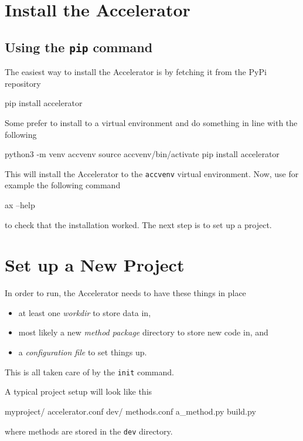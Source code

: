 
\section{Install the Accelerator}

\subsection{Using the \texttt{pip} command}
The easiest way to install the Accelerator is by fetching it from the
PyPi repository
\begin{shell}
pip install accelerator
\end{shell}
Some prefer to install to a virtual environment and do something in
line with the following
\begin{shell}
python3 -m venv accvenv
source accvenv/bin/activate
pip install accelerator
\end{shell}
This will install the Accelerator to the \texttt{accvenv} virtual
environment.  Now, use for example the following command
\begin{shell}
ax --help
\end{shell}
to check that the installation worked.  The next step is to set up a
project.



\section{Set up a New Project}
In order to run, the Accelerator needs to have these things in place
\begin{itemize}
\item[] at least one \textsl{workdir} to store data in,
\item[] most likely a new \textsl{method package} directory to store new code in, and
\item[] a \textsl{configuration file} to set things up.
\end{itemize}
This is all taken care of by the \texttt{init} command.

A typical project setup will look like this
\begin{shell}
myproject/
    accelerator.conf
    dev/
        methods.conf
        a_method.py
        build.py
\end{shell}
where methods are stored in the \texttt{dev} directory.



